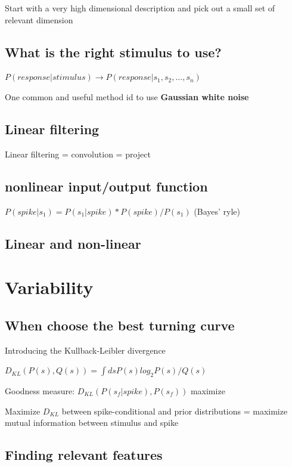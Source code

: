\documentclass{book}
\begin{document}
Start with a very high dimensional description and pick out a small set of relevant dimension

\subsection{What is the right stimulus to use?}
 
 $P(response|stimulus) \rightarrow P(response | s_1, s_2,...,s_n)$
 
 One common and useful method id to use \textbf{Gaussian white noise}
 
 \subsection{Linear filtering}
 
 Linear filtering = convolution = project
 
 \subsection{nonlinear input/output function}
 
 $P(spike|s_1) = P(s_1|spike) *P(spike) / P(s_1)$ (Bayes' ryle)
 
 \subsection{Linear and non-linear}
 
 \section{Variability}
 
 \subsection{When choose the best turning curve}
 
 Introducing the Kullback-Leibler divergence
 
 $D_{KL} (P(s), Q(s)) = \int ds P(s) log_2 P(s) / Q(s) $
 
 Goodness measure: $D_{KL} (P(s_f|spike), P(s_f))$ maximize
 
 Maximize $D_{KL}$ between spike-conditional and prior distributions = maximize mutual information between stimulus and spike
 
 \subsection{Finding relevant features}
 
\end{document}
